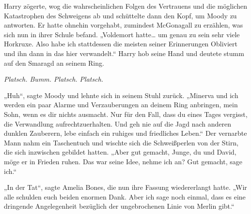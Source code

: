 Harry zögerte, wog die wahrscheinlichen Folgen des Vertrauens und die möglichen Katastrophen des Schweigens ab und schüttelte dann den Kopf, um Moody zu antworten. Er hatte ohnehin vorgehabt, zumindest McGonagall zu erzählen, was sich nun in ihrer Schule befand.
„Voldemort hatte… um genau zu sein sehr viele Horkruxe. Also habe ich stattdessen die meisten seiner Erinnerungen Obliviert und ihn dann in das hier verwandelt.“
Harry hob seine Hand und deutete stumm auf den Smaragd an seinem Ring.

\emph{Platsch. Bumm. Platsch. Platsch.}

„Huh“, sagte Moody und lehnte sich in seinem Stuhl zurück. „Minerva und ich werden ein paar Alarme und Verzauberungen an deinem Ring anbringen, mein Sohn, wenn es dir nichts ausmacht. Nur für den Fall, dass du eines Tages vergisst, die Verwandlung aufrechtzuerhalten. Und geh nie auf die Jagd nach anderen dunklen Zauberern, lebe einfach ein ruhiges und friedliches Leben.“
Der vernarbte Mann nahm ein Taschentuch und wischte sich die Schweißperlen von der Stirn, die sich inzwischen gebildet hatten.
„Aber gut gemacht, Junge, du und David, möge er in Frieden ruhen. Das war seine Idee, nehme ich an? Gut gemacht, sage ich.“

„In der Tat“, sagte Amelia Bones, die nun ihre Fassung wiedererlangt hatte.
„Wir alle schulden euch beiden enormen Dank. Aber ich sage noch einmal, dass es eine dringende Angelegenheit bezüglich der ungebrochenen Linie von Merlin gibt.“

